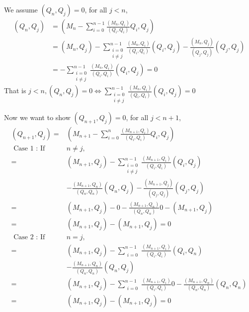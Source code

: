 \documentclass{article}
\begin{document}
We assume $(Q_n, Q_j) = 0$, for all $ j < n$,
\begin{equation}
  \begin{split}
    (Q_n, Q_j) &= (M_n - \sum^{n-1}_{i=0} \frac{(M_n, Q_i)}{(Q_i, Q_i)}Q_i, Q_j)\\
    &= (M_n, Q_j) - \sum^{n-1}_{\substack{i=0 \\ i \neq j}} \frac{(M_n, Q_i)}{(Q_i, Q_i)}(Q_i, Q_j) - \frac{(M_n, Q_j)}{(Q_j, Q_j)}(Q_j, Q_j)\\
    &= - \sum^{n-1}_{\substack{i=0 \\ i \neq j}} \frac{(M_n, Q_i)}{(Q_i, Q_i)}(Q_i, Q_j) = 0
  \end{split}
\end{equation}
That is $ j < n, (Q_n, Q_j) = 0 \Leftrightarrow \sum^{n-1}_{\substack{i=0 \\ i \neq j}} \frac{(M_n, Q_i)}{(Q_i, Q_i)}(Q_i, Q_j) = 0 $

Now we want to show $(Q_{n+1}, Q_j) = 0$, for all $ j < n+1$,
\begin{equation}
  \begin{split}
    (Q_{n+1}, Q_j) = &(M_{n+1} - \sum^{n}_{i=0} \frac{(M_{n+1}, Q_i)}{(Q_i, Q_i)}Q_i, Q_j)\\
    \text{ Case 1 : If }& n \neq j,  \\
    = &(M_{n+1}, Q_j) - \sum^{n-1}_{\substack{i=0 \\ i \neq j}} \frac{(M_{n+1}, Q_i)}{(Q_i, Q_i)}(Q_i, Q_j) \\
    &- \frac{(M_{n+1}, Q_n)}{(Q_n, Q_n)}(Q_n, Q_j) - \frac{(M_{n+1}, Q_j)}{(Q_j, Q_j)}(Q_j, Q_j)\\
    = &(M_{n+1}, Q_j) - 0 - \frac{(M_{n+1}, Q_n)}{(Q_n, Q_n)} 0 - (M_{n+1}, Q_j)\\
    = &(M_{n+1}, Q_j) - (M_{n+1}, Q_j) = 0\\
    \text{ Case 2 : If }& n = j,  \\
    = &(M_{n+1}, Q_j) - \sum^{n-1}_{\substack{i=0}} \frac{(M_{n+1}, Q_i)}{(Q_i, Q_i)}(Q_i, Q_n) \\
    &- \frac{(M_{n+1}, Q_n)}{(Q_n, Q_n)}(Q_n, Q_j) \\
    = &(M_{n+1}, Q_j) - \sum^{n-1}_{\substack{i=0}} \frac{(M_{n+1}, Q_i)}{(Q_i, Q_i)}0 - \frac{(M_{n+1}, Q_n)}{(Q_n, Q_n)}(Q_n, Q_n) \\
    = &(M_{n+1}, Q_j) - (M_{n+1}, Q_j) = 0\\
  \end{split}
\end{equation}
\end{document}
